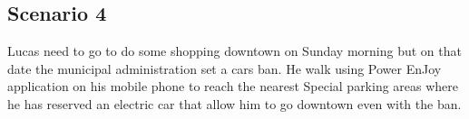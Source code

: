 \subsection{Scenario 4}

Lucas need to go to do some shopping downtown on Sunday morning but on that date the municipal administration set a cars ban.
He walk using Power EnJoy application on his mobile phone to reach the nearest Special parking areas where he has reserved an electric car that allow him to go downtown even with the ban.
